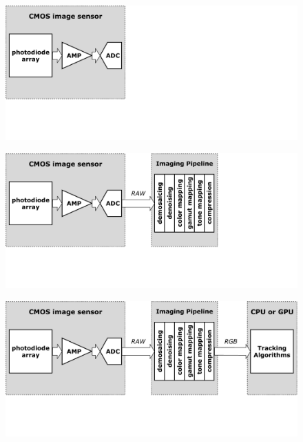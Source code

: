 \documentclass{beamer}
\begin{document}
\begin{frame}
    \begin{figure}[htpb]
        \begin{center}
            \includegraphics[width=1.0\linewidth]{fig/block0.pdf}
        \end{center}
    \end{figure}
\end{frame}

\begin{frame}
    \begin{figure}[htpb]
        \begin{center}
            \includegraphics[width=1.0\linewidth]{fig/block1.pdf}
        \end{center}
    \end{figure}
\end{frame}

\begin{frame}
    \begin{figure}[htpb]
        \begin{center}
            \includegraphics[width=1.0\linewidth]{fig/block2.pdf}
        \end{center}
    \end{figure}
\end{frame}
\end{document}

